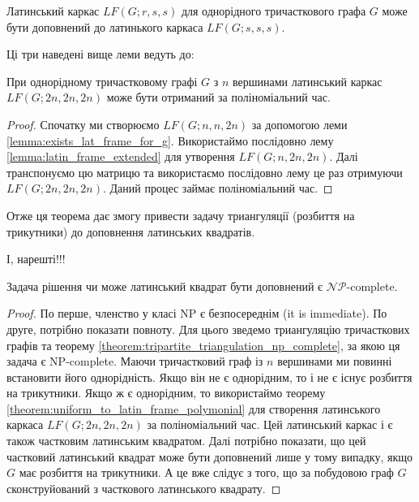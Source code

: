 \begin{lemma}
    \label{lemma:latin_frame_extended}
    Латинський каркас $LF(G; r, s, s)$ для однорідного тричасткового графа $G$ може бути доповнений до латинького каркаса $LF(G; s, s, s)$.
\end{lemma}

Ці три наведені вище леми ведуть до:
\begin{theorem}
    \label{theorem:uniform_to_latin_frame_polymonial}
    При однорідному тричастковому графі $G$ з $n$ вершинами латинський каркас $LF(G; 2n,2n,2n)$ може бути отриманий за поліноміальний час.
\end{theorem}

\begin{proof}
    Спочатку ми створюємо $LF(G; n, n, 2n)$ за допомогою леми \ref{lemma:exists_lat_frame_for_g}.
    Використаймо послідовно лему \ref{lemma:latin_frame_extended} для утворення $LF(G; n, 2n, 2n)$.
    Далі транспонуємо цю матрицю та використаємо послідовно лему це раз отримуючи $LF(G; 2n, 2n, 2n)$.
    Даний процес займає поліноміальний час. 
\end{proof}

Отже ця теорема дає змогу привести задачу триангуляції (розбиття на трикутники) до доповнення латинських квадратів.

І, нарешті!!!
\begin{theorem}
    Задача рішення чи може латинський квадрат бути доповнений є $\mathcal{NP}$-complete.
\end{theorem}
\begin{proof}
    По перше, членство у класі NP є безпосереднім (it is immediate). По друге, потрібно показати повноту.
    Для цього зведемо триангуляцію тричасткових графів та теорему \ref{theorem:tripartite_triangulation_np_complete}, за якою ця задача є NP-complete.
    Маючи тричастковий граф із $n$ вершинами ми повинні встановити його однорідність.
    Якщо він не є однорідним, то і не є існує розбиття на трикутники. Якщо ж є однорідним, то використаймо теорему \ref{theorem:uniform_to_latin_frame_polymonial} для створення латинського каркаса $LF(G; 2n, 2n, 2n)$ за поліноміальний час. Цей латинський каркас і є також частковим латинським квадратом.
    Далі потрібно показати, що цей частковий латинський квадрат може бути доповнений лише у тому випадку, якщо $G$ має розбиття на трикутники.
    А це вже слідує з того, що за побудовою граф $G$ сконструйований з часткового латинського квадрату.
\end{proof}
